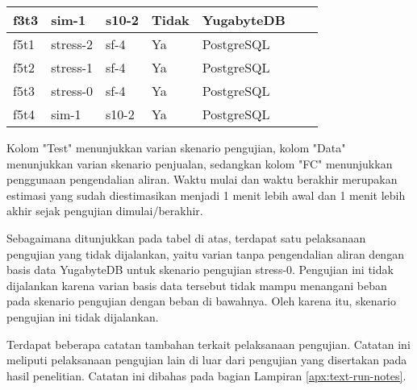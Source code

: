 \begin{table}[htbp]
\begin{tabular}{|l|l|l|l|l|l|l|}
        f3t3        & sim-1                 & s10-2             & Tidak                        & YugabyteDB          \\ \hline
        f5t1        & stress-2              & sf-4              & Ya                           & PostgreSQL          \\ \hline
        f5t2        & stress-1              & sf-4              & Ya                           & PostgreSQL          \\ \hline
        f5t3        & stress-0              & sf-4              & Ya                           & PostgreSQL          \\ \hline
        f5t4        & sim-1                 & s10-2             & Ya                           & PostgreSQL          \\ \hline
    \end{tabular}
\end{table}

Kolom "Test" menunjukkan varian skenario pengujian, kolom "Data" menunjukkan varian skenario penjualan, sedangkan kolom "FC" menunjukkan penggunaan pengendalian aliran. Waktu mulai dan waktu berakhir merupakan estimasi yang sudah diestimasikan menjadi 1 menit lebih awal dan 1 menit lebih akhir sejak pengujian dimulai/berakhir.

Sebagaimana ditunjukkan pada tabel di atas, terdapat satu pelaksanaan pengujian yang tidak dijalankan, yaitu varian tanpa pengendalian aliran dengan basis data YugabyteDB untuk skenario pengujian stress-0. Pengujian ini tidak dijalankan karena varian basis data tersebut tidak mampu menangani beban pada skenario pengujian dengan beban di bawahnya. Oleh karena itu, skenario pengujian ini tidak dijalankan.

Terdapat beberapa catatan tambahan terkait pelaksanaan pengujian. Catatan ini meliputi pelaksanaan pengujian lain di luar dari pengujian yang disertakan pada hasil penelitian. Catatan ini dibahas pada bagian Lampiran \ref{apx:text-run-notes}.
